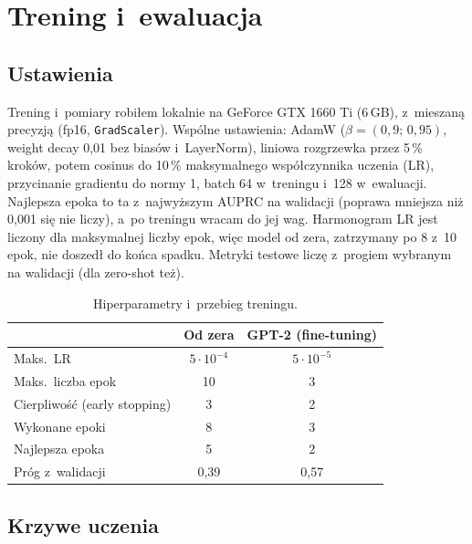 \documentclass[10pt,a4paper]{article}
\begin{document}
\section{Trening i~ewaluacja}

\subsection{Ustawienia}

Trening i~pomiary robiłem lokalnie na GeForce GTX 1660 Ti (6\,GB), z~mieszaną precyzją (fp16, \texttt{GradScaler}). Wspólne ustawienia: AdamW ($\beta=(0{,}9;\,0{,}95)$, weight decay 0,01 bez biasów i~LayerNorm), liniowa rozgrzewka przez 5\,\% kroków, potem cosinus do 10\,\% maksymalnego współczynnika uczenia (LR), przycinanie gradientu do normy 1, batch 64 w~treningu i~128 w~ewaluacji. Najlepsza epoka to ta z~najwyższym AUPRC na walidacji (poprawa mniejsza niż 0,001 się nie liczy), a~po treningu wracam do jej wag. Harmonogram LR jest liczony dla maksymalnej liczby epok, więc model od zera, zatrzymany po 8 z~10 epok, nie doszedł do końca spadku. Metryki testowe liczę z~progiem wybranym na walidacji (dla zero-shot też).

\begin{table}[htbp]
\centering
\begin{tabular}{lcc}
\toprule
 & Od zera & GPT-2 (fine-tuning) \\
\midrule
Maks.\ LR            & $5\cdot10^{-4}$ & $5\cdot10^{-5}$ \\
Maks.\ liczba epok   & 10 & 3 \\
Cierpliwość (early stopping) & 3 & 2 \\
Wykonane epoki       & 8 & 3 \\
Najlepsza epoka      & 5 & 2 \\
Próg z~walidacji     & 0,39 & 0,57 \\
\bottomrule
\end{tabular}
\caption{Hiperparametry i~przebieg treningu.}
\label{tab:setup}
\end{table}

\subsection{Krzywe uczenia}
\end{document}
